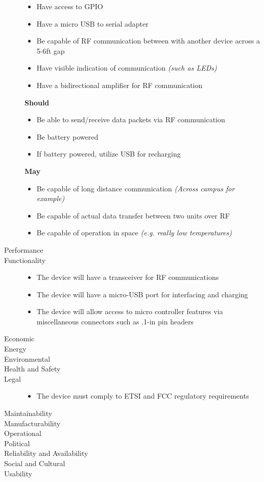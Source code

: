 \documentclass[12pt]{article}
\begin{document}
\begin{description}
\begin{itemize}
			\item{Have access to GPIO}
			\item{Have a micro USB to serial adapter}
			\item{Be capable of RF communication between with another device across a 5-6ft gap}
			\item{Have visible indication of communication \textit{(such as LEDs)}}
			\item{Have a bidirectional amplifier for RF communication}
		\end{itemize}
		\textbf{Should}
		\begin{itemize}
			\item{Be able to send/receive data packets via RF communication}
			\item{Be battery powered}
			\item{If battery powered, utilize USB for recharging}
		\end{itemize}
		\textbf{May}
		\begin{itemize}
			\item{Be capable of long distance communication \textit{(Across campus for example)}}
			\item{Be capable of actual data transfer between two units over RF}
			\item{Be capable of operation in space \textit{(e.g. really low temperatures)}}
		\end{itemize}
	\item[Performance]
	\item[Functionality] \hfill
		\begin{itemize}
			\item{The device will have a transceiver for RF communications}
			\item{The device will have a micro-USB port for interfacing and charging}
			\item{The device will allow access to micro controller features via miscellaneous connectors such as .1-in pin headers}
		\end{itemize}
	\item[Economic]
	\item[Energy]
	\item[Environmental]
	\item[Health and Safety]
	\item[Legal] \hfill
		\begin{itemize}
			\item{The device must comply to ETSI and FCC regulatory requirements}
		\end{itemize}
	\item[Maintainability]
	\item[Manufacturability]
	\item[Operational]
	\item[Political]
	\item[Reliability and Availability]
	\item[Social and Cultural]
	\item[Usability]
\end{description}
\end{document}
